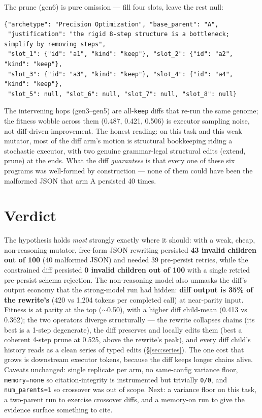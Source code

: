 \documentclass[11pt]{article}
\newcommand{\armA}{\textcolor{bad}{arm A}}
\begin{document}
The prune (gen6) is pure omission --- fill four slots, leave the rest null:
\begin{lstlisting}
{"archetype": "Precision Optimization", "base_parent": "A",
 "justification": "the rigid 8-step structure is a bottleneck; simplify by removing steps",
 "slot_1": {"id": "a1", "kind": "keep"}, "slot_2": {"id": "a2", "kind": "keep"},
 "slot_3": {"id": "a3", "kind": "keep"}, "slot_4": {"id": "a4", "kind": "keep"},
 "slot_5": null, "slot_6": null, "slot_7": null, "slot_8": null}
\end{lstlisting}
The intervening hops (gen3--gen5) are all-\texttt{keep} diffs that re-run the same genome; the
fitness wobble across them (0.487, 0.421, 0.506) is executor sampling noise, not diff-driven
improvement. The honest reading: on this task and this weak mutator, most of the diff arm's
motion is structural bookkeeping riding a stochastic executor, with two genuine
grammar-legal structural edits (extend, prune) at the ends. What the diff \emph{guarantees}
is that every one of these six programs was well-formed by construction --- none of them could
have been the malformed JSON that \armA{} persisted 40 times.

\section{Verdict}
The hypothesis holds \emph{most} strongly exactly where it should: with a weak, cheap,
non-reasoning mutator, free-form JSON rewriting persisted \textbf{43 invalid children out of
100} (40 malformed JSON) and needed 39 pre-persist retries, while the constrained diff
persisted \textbf{0 invalid children out of 100} with a single retried pre-persist
schema rejection. The non-reasoning model also unmasks the diff's output economy that the strong-model
run had hidden: \textbf{diff output is 35\% of the rewrite's} (420 vs 1{,}204 tokens per
completed call) at near-parity input. Fitness is at parity at the top ($\sim$0.50), with a
higher diff child-mean (0.413 vs 0.362); the two operators diverge structurally --- the
rewrite collapses chains (its best is a 1-step degenerate), the diff preserves and locally
edits them (best a coherent 4-step prune at 0.525, above the rewrite's peak), and every diff
child's history reads as a clean series of typed edits (\S\ref{sec:series}). The one cost that
grows is downstream executor tokens, because the diff keeps longer chains alive. Caveats
unchanged: single replicate per arm, no same-config variance floor, \texttt{memory=none} so
citation-integrity is instrumented but trivially \texttt{0/0}, and \texttt{num\_parents=1} so
crossover was out of scope. Next: a variance floor on this task, a two-parent run to exercise
crossover diffs, and a memory-on run to give the evidence surface something to cite.
\end{document}
